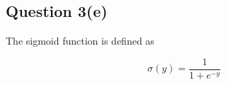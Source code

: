\documentclass[10pt,a4paper]{article}
\begin{document}
\subsection{Question 3(e)}

The sigmoid function is defined as

\begin{equation}
\sigma(y) = \frac{1}{1+e^{-y}}
\end{equation}


\end{document}
